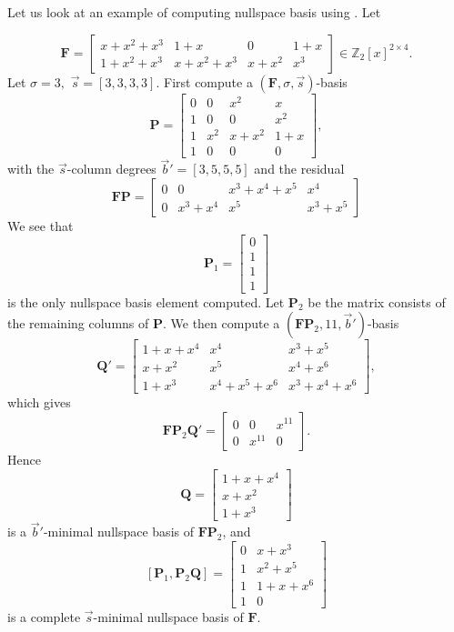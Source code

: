 \begin{exmp}
\label{exm:continueComputingNullspaceBasisByColumns}Let us look at
an example of computing nullspace basis using .
Let 

\[
\mathbf{F}=\left[\begin{array}{cccc}
x+x^{2}+x^{3} & 1+x & 0 & 1+x\\
1+x^{2}+x^{3} & x+x^{2}+x^{3} & x+x^{2} & x^{3}
\end{array}\right]\in\mathbb{Z}_{2}\left[x\right]^{2\times4}.
\]
Let $\sigma=3,$ $\vec{s}=\left[3,3,3,3\right]$. First compute a
$\left(\mathbf{F},\sigma,\vec{s}\right)$-basis 
\[
\mathbf{P}=\left[\begin{array}{cccc}
0 & 0 & x^{2} & x\\
1 & 0 & 0 & x^{2}\\
1 & x^{2} & x+x^{2} & 1+x\\
1 & 0 & 0 & 0
\end{array}\right],
\]
 with the $\vec{s}$-column degrees $\vec{b}'=\left[3,5,5,5\right]$
and the residual 
\[
\mathbf{F}\mathbf{P}=\left[\begin{array}{cccc}
0 & 0 & x^{3}+x^{4}+x^{5} & x^{4}\\
0 & x^{3}+x^{4} & x^{5} & x^{3}+x^{5}
\end{array}\right]
\]
 We see that 
\[
\mathbf{P}_{1}=\begin{bmatrix}0\\
1\\
1\\
1
\end{bmatrix}
\]
 is the only nullspace basis element computed. Let $\mathbf{P}_{2}$
be the matrix consists of the remaining columns of $\mathbf{P}$.
We then compute a $\left(\mathbf{F}\mathbf{P}_{2},11,\vec{b}'\right)$-basis
\[
\mathbf{Q}'=\left[\begin{array}{ccc}
1+x+x^{4} & x^{4} & x^{3}+x^{5}\\
x+x^{2} & x^{5} & x^{4}+x^{6}\\
1+x^{3} & x^{4}+x^{5}+x^{6} & x^{3}+x^{4}+x^{6}
\end{array}\right],
\]
 which gives 
\[
\mathbf{F}\mathbf{P}_{2}\mathbf{Q}'=\begin{bmatrix}0 & 0 & x^{11}\\
0 & x^{11} & 0
\end{bmatrix}.
\]
 Hence 
\[
\mathbf{Q}=\begin{bmatrix}1+x+x^{4}\\
x+x^{2}\\
1+x^{3}
\end{bmatrix}
\]
 is a $\vec{b}'$-minimal nullspace basis of $\mathbf{F}\mathbf{P}_{2}$,
and 
\[
\left[\mathbf{P}_{1},\mathbf{P}_{2}\mathbf{Q}\right]=\left[\begin{array}{cc}
0 & x+x^{3}\\
1 & x^{2}+x^{5}\\
1 & 1+x+x^{6}\\
1 & 0
\end{array}\right]
\]
 is a complete $\vec{s}$-minimal nullspace basis of $\mathbf{F}$. 
\end{exmp}
